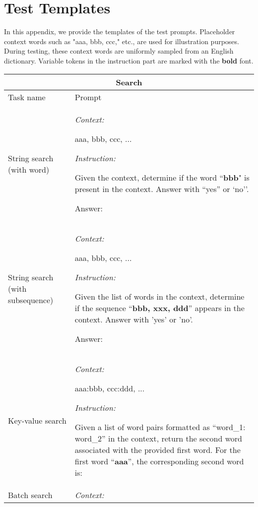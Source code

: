 \section{Test Templates}
\label{apd:prompt_example}
In this appendix, we provide the templates of the test prompts. Placeholder context words such as "aaa, bbb, ccc," etc., are used for illustration purposes. During testing, these context words are uniformly sampled from an English dictionary. Variable tokens in the instruction part are marked with the \textbf{bold} font.

\begin{longtable}{p{3cm}p{12cm}}
        \toprule
        \multicolumn{2}{c}{\textbf{Search} } \\
        \midrule
         Task name & Prompt  \\
         \midrule
         String search (with word) & \textit{Context:}
         
         aaa, bbb, ccc, ...
         
         \textit{Instruction:}
         
         Given the context, determine if the word ``\textbf{bbb}" is present in the context. Answer with ``yes'' or `no''.
         
         Answer: \\
         
         \midrule
         String search (with subsequence) & \textit{Context:}
         
         aaa, bbb, ccc, ...
         
         \textit{Instruction:}
         
         Given the list of words in the context, determine if the sequence ``\textbf{bbb, xxx, ddd}'' appears in the context. Answer with 'yes' or 'no'.
         
         Answer: \\
         
         \midrule
         
         Key-value search & \textit{Context:} 
         
         aaa:bbb, ccc:ddd, ...
         
         \textit{Instruction:}
         
         Given a list of word pairs formatted as ``word\_1: word\_2'' in the context, return the second word associated with the provided first word. For the first word ``\textbf{aaa}'', the corresponding second word is:\\
         \midrule
         Batch search & \textit{Context: }
         

\end{longtable}
